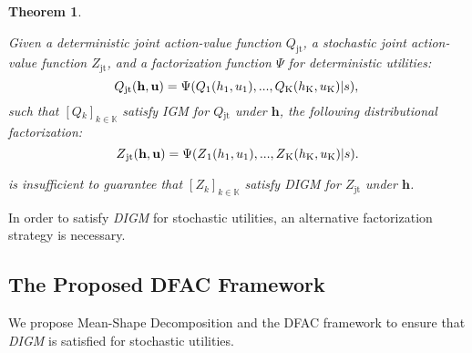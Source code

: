 \documentclass{article}
\newcommand{\state}{s}
\newcommand{\jointaction}{\mathbf{u}}
\newcommand{\action}{u}
\newcommand{\jointobservationhistory}{\mathbf{h}}
\newcommand{\observationhistory}{h}
\newcommand{\agentspace}{\mathbb{K}}
\newcommand{\agentcounter}{k}
\newcommand{\numberofagents}{\mathrm{K}}
\newcommand{\utilityexp}{Q}
\newcommand{\utility}{Z}
\newcommand{\joint}{\mathrm{jt}}
\newcommand{\meandecompositionfunction}{\Psi}
\newcommand{\digm}{\textit{DIGM}}
\newtheorem{theorem}{Theorem}[section]
\begin{document}
\begin{theorem}
\label{thm:distributional_igm}

Given a deterministic joint action-value function $\utilityexp_{\joint}$, a stochastic joint action-value function $\utility_{\joint}$, and a factorization function $\meandecompositionfunction$ for deterministic utilities:
\begin{equation}
\utilityexp{}_{\joint{}}(\jointobservationhistory{},{\jointaction{}})=\meandecompositionfunction(\utilityexp{}_1(\observationhistory{}_1,\action{}_1), ..., \utilityexp{}_{\numberofagents{}}(\observationhistory{}_{\numberofagents{}},\action{}_{\numberofagents{}})\vert\state),
\notag{}
\end{equation}
such that $[\utilityexp{}_\agentcounter{}]_{\agentcounter{}\in\agentspace{}}$ satisfy IGM for $\utilityexp{}_{\joint{}}$ under $\jointobservationhistory{}$, the following distributional factorization:
\begin{equation}
\utility{}_{\joint{}}(\jointobservationhistory{},{\jointaction{}})=\meandecompositionfunction(\utility{}_1(\observationhistory{}_1,\action{}_1), ..., \utility{}_{\numberofagents{}}(\observationhistory{}_{\numberofagents{}},\action{}_{\numberofagents{}})\vert\state).
\notag{}
\end{equation}

is insufficient to guarantee that $[\utility{}_\agentcounter{}]_{\agentcounter{}\in\agentspace{}}$ satisfy \digm{} for $\utility{}_{\joint{}}$ under $\jointobservationhistory{}$.

\end{theorem} 
In order to satisfy \digm{} for stochastic utilities, an alternative factorization strategy is necessary.



\subsection{The Proposed DFAC Framework}
\label{subsec:methodology_the_proposed_dfac_framework}

We propose Mean-Shape Decomposition and the DFAC framework to ensure that \digm{} is satisfied for stochastic utilities.
\end{document}
